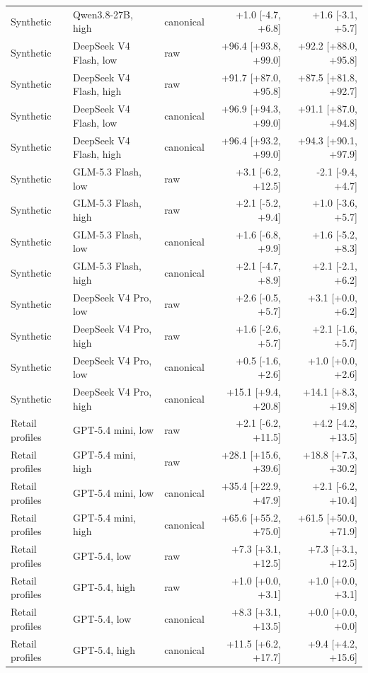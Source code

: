 \begin{table}[htbp]
\begin{tabular}{lllrr}
Synthetic & Qwen3.8-27B, high & canonical & +1.0 [-4.7, +6.8] & +1.6 [-3.1, +5.7] \\
Synthetic & DeepSeek V4 Flash, low & raw & +96.4 [+93.8, +99.0] & +92.2 [+88.0, +95.8] \\
Synthetic & DeepSeek V4 Flash, high & raw & +91.7 [+87.0, +95.8] & +87.5 [+81.8, +92.7] \\
Synthetic & DeepSeek V4 Flash, low & canonical & +96.9 [+94.3, +99.0] & +91.1 [+87.0, +94.8] \\
Synthetic & DeepSeek V4 Flash, high & canonical & +96.4 [+93.2, +99.0] & +94.3 [+90.1, +97.9] \\
Synthetic & GLM-5.3 Flash, low & raw & +3.1 [-6.2, +12.5] & -2.1 [-9.4, +4.7] \\
Synthetic & GLM-5.3 Flash, high & raw & +2.1 [-5.2, +9.4] & +1.0 [-3.6, +5.7] \\
Synthetic & GLM-5.3 Flash, low & canonical & +1.6 [-6.8, +9.9] & +1.6 [-5.2, +8.3] \\
Synthetic & GLM-5.3 Flash, high & canonical & +2.1 [-4.7, +8.9] & +2.1 [-2.1, +6.2] \\
Synthetic & DeepSeek V4 Pro, low & raw & +2.6 [-0.5, +5.7] & +3.1 [+0.0, +6.2] \\
Synthetic & DeepSeek V4 Pro, high & raw & +1.6 [-2.6, +5.7] & +2.1 [-1.6, +5.7] \\
Synthetic & DeepSeek V4 Pro, low & canonical & +0.5 [-1.6, +2.6] & +1.0 [+0.0, +2.6] \\
Synthetic & DeepSeek V4 Pro, high & canonical & +15.1 [+9.4, +20.8] & +14.1 [+8.3, +19.8] \\
Retail profiles & GPT-5.4 mini, low & raw & +2.1 [-6.2, +11.5] & +4.2 [-4.2, +13.5] \\
Retail profiles & GPT-5.4 mini, high & raw & +28.1 [+15.6, +39.6] & +18.8 [+7.3, +30.2] \\
Retail profiles & GPT-5.4 mini, low & canonical & +35.4 [+22.9, +47.9] & +2.1 [-6.2, +10.4] \\
Retail profiles & GPT-5.4 mini, high & canonical & +65.6 [+55.2, +75.0] & +61.5 [+50.0, +71.9] \\
Retail profiles & GPT-5.4, low & raw & +7.3 [+3.1, +12.5] & +7.3 [+3.1, +12.5] \\
Retail profiles & GPT-5.4, high & raw & +1.0 [+0.0, +3.1] & +1.0 [+0.0, +3.1] \\
Retail profiles & GPT-5.4, low & canonical & +8.3 [+3.1, +13.5] & +0.0 [+0.0, +0.0] \\
Retail profiles & GPT-5.4, high & canonical & +11.5 [+6.2, +17.7] & +9.4 [+4.2, +15.6] \\

\end{tabular}
\end{table}
